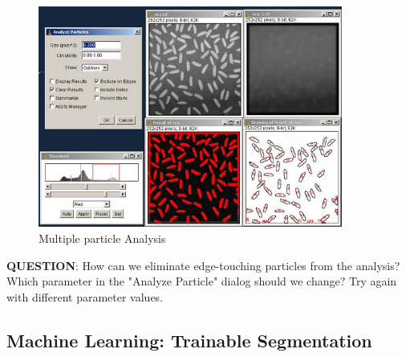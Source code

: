 \begin{indentexercise}{2}
\begin{figure}[H]
\begin{center}
\includegraphics[width=10cm]{img/CMCIBasicCourse201102-img120.jpg}
\caption{ Multiple particle Analysis}
\label{fig:img120}
\end{center}
\end{figure}

\textbf{QUESTION}: How can we eliminate edge-touching particles from the
analysis? Which parameter in the "Analyze
Particle" dialog should we change? Try again with
different parameter values.
\end{indentexercise}

\subsection{Machine Learning: Trainable Segmentation}

